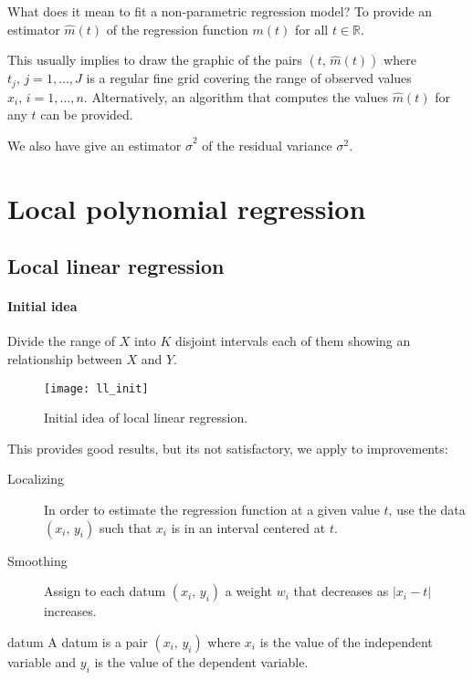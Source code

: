 \begin{question}{What does it mean to fit a non-parametric regression model?}{}
	To provide an estimator $\hat{m}(t)$ of the regression function $m(t)$ for
	all $t \in \mathbb{R}$.

	This usually implies to draw the graphic of the pairs $(t,\, \hat{m}(t))$ where
	$t_j,\, j=1,\ldots,J$ is a regular fine grid covering the range of observed values
	$x_i,\, i=1,\ldots,n$.
	Alternatively, an algorithm that computes the values $\hat{m}(t)$ for any $t$
	can be provided.

	We also have give an estimator $\hat\sigma^2$ of the residual variance $\sigma^2$.
\end{question}

\clearpage
\section{Local polynomial regression}
\subsection{Local linear regression}

\paragraph{Initial idea} Divide the range of $X$ into $K$ disjoint intervals
each of them showing an  relationship between $X$ and $Y$.
\begin{figure}[H]
	\texttt{[image: ll\_init]}
	\caption{Initial idea of local linear regression.}
\end{figure}

This provides good results, but its not satisfactory, we apply to improvements:
\begin{description}
	\item[Localizing] In order to estimate the regression function at a given value $t$,
		use the data $(x_i,\, y_i)$ such that $x_i$ is in an interval centered at $t$.
	\item[Smoothing] Assign to each datum $(x_i,\, y_i)$ a weight $w_i$ that decreases
		as $|x_i - t|$ increases.
\end{description}

\begin{definition}{datum}{}
	A datum is a pair $(x_i,\, y_i)$ where $x_i$ is the value of the independent
	variable and $y_i$ is the value of the dependent variable.
\end{definition}

